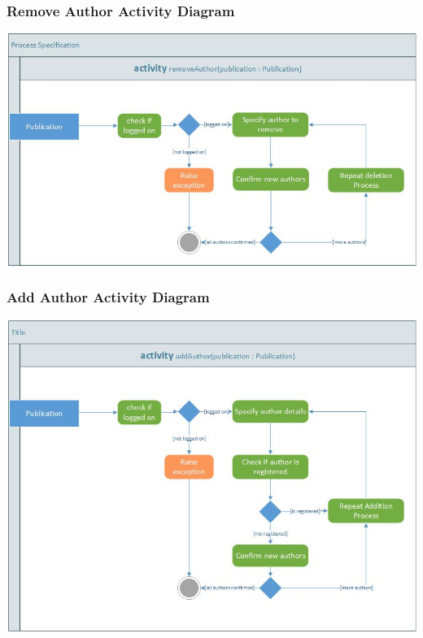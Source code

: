 \documentclass[a4paper,12pt]{article}
\begin{document}
	\subsubsection{Remove Author Activity Diagram}
	\includegraphics[width=1\textwidth]{./activity_remove_author.jpg}\\[1.5cm]

	\subsubsection{Add Author Activity Diagram}
	\includegraphics[width=1\textwidth]{./activity_add_author.jpg}\\[1.5cm]
\end{document}
